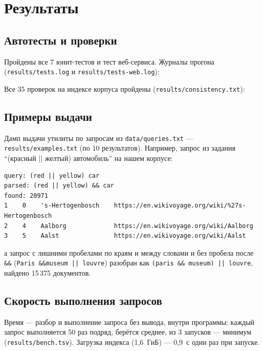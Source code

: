 \section{Результаты}
\subsection{Автотесты и проверки}
Пройдены все 7 юнит-тестов и тест веб-сервиса. Журналы прогона (\texttt{results/tests.log} и \texttt{results/tests-web.log}):

{\scriptsize
{}

}

Все 35 проверок на индексе корпуса пройдены (\texttt{results/consistency.txt}):

{\scriptsize
{}
}

\subsection{Примеры выдачи}
Дамп выдачи утилиты по запросам из \texttt{data/queries.txt} --- \texttt{results/examples.txt} (по 10 результатов). Например, запрос из задания \enquote{(красный || желтый) автомобиль} на нашем корпусе:

{\scriptsize
\begin{verbatim}
query: (red || yellow) car
parsed: (red || yellow) && car
found: 20971
1    0    's-Hertogenbosch    https://en.wikivoyage.org/wiki/%27s-Hertogenbosch
2    4    Aalborg             https://en.wikivoyage.org/wiki/Aalborg
3    5    Aalst               https://en.wikivoyage.org/wiki/Aalst
\end{verbatim}
}
а запрос с лишними пробелами по краям и между словами и без пробела после \texttt{\&\&} (\texttt{Paris \&\&museum || louvre}) разобран как \texttt{(paris \&\& museum) || louvre}, найдено 15\,375 документов.

\subsection{Скорость выполнения запросов}
Время --- разбор и выполнение запроса без вывода, внутри программы: каждый запрос выполняется 50 раз подряд, берётся среднее, из 3 запусков --- минимум (\texttt{results/bench.tsv}). Загрузка индекса (1,6~ГиБ) --- 0,9~с один раз при запуске.

{\small

}

